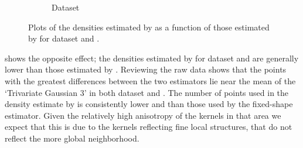 \begin{figure}
\begin{subfigure}{0.3\textwidth}
				\caption{Dataset \baakmanTwo}
				\label{fig:discussion:performance:mbevssambe:baakman2}
			\end{subfigure}	
			\caption{Plots of the densities estimated by \sambe as a function of those estimated by \mbe for dataset %
				\ferdosiTwo and %
				\baakmanTwo.
			}
			\label{fig:discussion:performance:two:mbevssambe}
		\end{figure}
		
		 shows the opposite effect; the densities estimated by \sambe for dataset \ferdosiThree and \baakmanThree are generally lower than those estimated by \mbe. Reviewing the raw data shows that the points with the greatest differences between the two estimators lie near the mean of the `Trivariate Gaussian 3' in both dataset \ferdosiThree and \baakmanThree. The number of points used in the density estimate by \sambe is consistently lower and than those used by the fixed-shape estimator. Given the relatively high anisotropy of the kernels in that area we expect that this is due to the kernels reflecting fine local structures, that do not reflect the more global neighborhood. 
